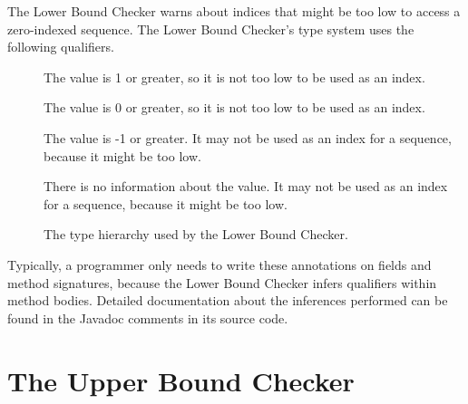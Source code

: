 The Lower Bound Checker warns about indices that might be
too low to access a zero-indexed sequence. The
Lower Bound Checker's type system uses the following qualifiers.

\begin{description}
\item[]
  The value is 1 or greater, so it is not too low to be used as an index.
\item[]
  The value is 0 or greater, so it is not too low to be used as an index.
\item[]
  The value is -1 or greater.
  It may not be used as an index for a sequence, because it might be too low.
\item[]
  There is no information about the value.
  It may not be used as an index for a sequence, because it might be too low.
\end{description}

\begin{figure}
  \caption{The type hierarchy used by the Lower Bound Checker.}
  \label{fig-lowerbound-types}
\end{figure}


Typically, a programmer only needs to write these annotations on
fields and method signatures, because the Lower Bound Checker infers
qualifiers within method bodies.
Detailed documentation about the inferences performed can be found
in the Javadoc comments in its source code.


\section{The Upper Bound Checker\label{index-upperbound}}

